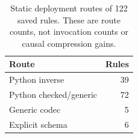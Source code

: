 \begin{table}[t]\centering\small
\caption{Static deployment routes of 122 saved rules. These are route counts, not invocation counts or causal compression gains.}
\label{tab:program-routes}
\begin{tabular}{lr}
\toprule
Route & Rules \\
\midrule
Python inverse & 39 \\
Python checked/generic & 72 \\
Generic codec & 5 \\
Explicit schema & 6 \\
\bottomrule
\end{tabular}\end{table}
